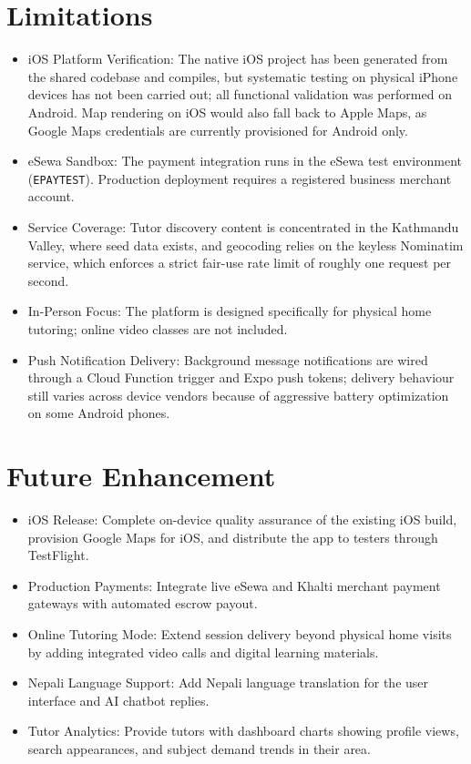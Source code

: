 \documentclass[12pt]{report}
\begin{document}
\section{Limitations}
\begin{itemize}
\item iOS Platform Verification: The native iOS project has been generated from the shared codebase and compiles, but systematic testing on physical iPhone devices has not been carried out; all functional validation was performed on Android. Map rendering on iOS would also fall back to Apple Maps, as Google Maps credentials are currently provisioned for Android only.
\item eSewa Sandbox: The payment integration runs in the eSewa test environment (\texttt{EPAYTEST}). Production deployment requires a registered business merchant account.
\item Service Coverage: Tutor discovery content is concentrated in the Kathmandu Valley, where seed data exists, and geocoding relies on the keyless Nominatim service, which enforces a strict fair-use rate limit of roughly one request per second.
\item In-Person Focus: The platform is designed specifically for physical home tutoring; online video classes are not included.
\item Push Notification Delivery: Background message notifications are wired through a Cloud Function trigger and Expo push tokens; delivery behaviour still varies across device vendors because of aggressive battery optimization on some Android phones.
\end{itemize}

\section{Future Enhancement}
\begin{itemize}
\item iOS Release: Complete on-device quality assurance of the existing iOS build, provision Google Maps for iOS, and distribute the app to testers through TestFlight.
\item Production Payments: Integrate live eSewa and Khalti merchant payment gateways with automated escrow payout.
\item Online Tutoring Mode: Extend session delivery beyond physical home visits by adding integrated video calls and digital learning materials.
\item Nepali Language Support: Add Nepali language translation for the user interface and AI chatbot replies.
\item Tutor Analytics: Provide tutors with dashboard charts showing profile views, search appearances, and subject demand trends in their area.
\end{itemize}
\end{document}
